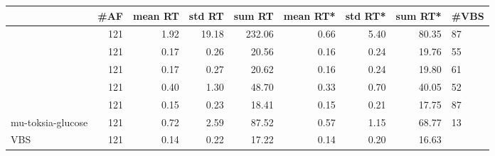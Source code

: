 \begin{tabular}{lrrrrrrr}
\toprule
{} &  \#AF &  mean RT &  std RT &  sum RT &  mean RT* &  std RT* &  sum RT* & \#VBS \\
\midrule
{}            &  121 &     1.92 &   19.18 &  232.06 &      0.66 &     5.40 &    80.35 &   87 \\
            &  121 &     0.17 &    0.26 &   20.56 &      0.16 &     0.24 &    19.76 &   55 \\
            &  121 &     0.17 &    0.27 &   20.62 &      0.16 &     0.24 &    19.80 &   61 \\
            &  121 &     0.40 &    1.30 &   48.70 &      0.33 &     0.70 &    40.05 &   52 \\
            &  121 &     0.15 &    0.23 &   18.41 &      0.15 &     0.21 &    17.75 &   87 \\
mu-toksia-glucose &  121 &     0.72 &    2.59 &   87.52 &      0.57 &     1.15 &    68.77 &   13 \\
VBS               &  121 &     0.14 &    0.22 &   17.22 &      0.14 &     0.20 &    16.63 &      \\
\bottomrule
\end{tabular}
